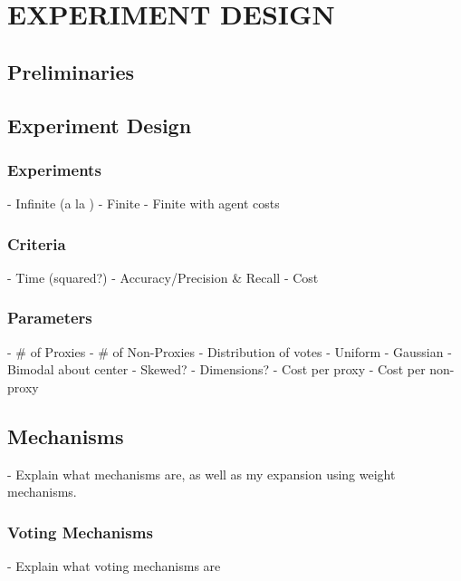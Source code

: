 %
%

\chapter{EXPERIMENT DESIGN}\label{ch:experiment-design}

\section{Preliminaries}\label{sec:preliminaries}

\section{Experiment Design}\label{sec:experiment-design}

\subsection{Experiments}\label{sec:experiments}
- Infinite (a la \cite{Cohensius2017})
- Finite
- Finite with agent costs

\subsection{Criteria}\label{subsec:criteria}
- Time (squared?)
- Accuracy/Precision \& Recall
- Cost

\subsection{Parameters}\label{subsec:parameters}
- \# of Proxies
- \# of Non-Proxies
- Distribution of votes
    - Uniform
    - Gaussian
    - Bimodal about center
    - Skewed?
- Dimensions?
- Cost per proxy
- Cost per non-proxy



\section{Mechanisms}\label{sec:mechanisms}
- Explain what mechanisms are, as well as my expansion using weight mechanisms.

\subsection{Voting Mechanisms}\label{subsec:voting-mechanisms}
- Explain what voting mechanisms are

